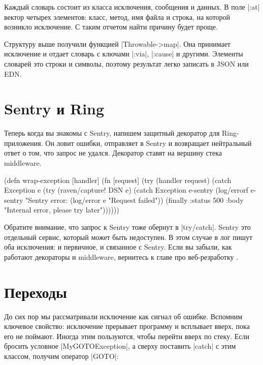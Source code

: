 Каждый словарь состоит из класса исключения, сообщения и данных. В поле
\spverb|:at| вектор четырех элементов: класс, метод, имя файла и строка, на
которой возникло исключение. С таким отчетом найти причину будет проще.

Структуру выше получили функцией \spverb|Throwable->map|. Она принимает
исключение и отдает словарь с ключами \spverb|:via|, \spverb|:cause| и
другими. Элементы словарей это строки и символы, поэтому результат легко
записать в JSON или EDN.

\section{Sentry и Ring}

Теперь когда вы знакомы с Sentry, напишем защитный декоратор для
Ring-приложения. Он ловит ошибки, отправляет в Sentry и возвращает нейтральный
ответ о том, что запрос не удался. Декоратор ставят на вершину стека middleware.

\begin{english}
  \begin{clojure}
(defn wrap-exception
  [handler]
  (fn [request]
    (try
      (handler request)
      (catch Exception e
        (try
          (raven/capture! DSN e)
          (catch Exception e-sentry
            (log/errorf e-sentry "Sentry error: %
            (log/error e "Request failed"))
          (finally
            {:status 500
             :body "Internal error, please try later"}))))))
  \end{clojure}
\end{english}

Обратите внимание, что запрос к Sentry тоже обернут в \spverb|try/catch|. Sentry
это отдельный сервис, который может быть недоступен. В этом случае в лог пишут
оба исключения: и первичное, и связанное с Sentry. Если вы забыли, как работают
декораторы и middleware, вернитесь к главе про веб-резработку .

\section{Переходы}

До сих пор мы рассматривали исключение как сигнал об ошибке. Вспомним ключевое
свойство: исключение прерывает программу и всплывает вверх, пока его не
поймают. Иногда этим пользуются, чтобы перейти вверх по стеку. Если бросить
условное \spverb|MyGOTOException|, а сверху поставить \spverb|catch| с этим
классом, получим оператор \spverb|GOTO|:

